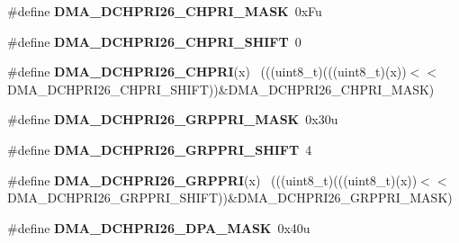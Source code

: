 \begin{DoxyCompactItemize}
\item 
\hypertarget{group___d_m_a___register___masks_gaf82eafce155eb9905efba3706f4b63af}{}\#define {\bfseries D\+M\+A\+\_\+\+D\+C\+H\+P\+R\+I26\+\_\+\+C\+H\+P\+R\+I\+\_\+\+M\+A\+S\+K}~0x\+Fu\label{group___d_m_a___register___masks_gaf82eafce155eb9905efba3706f4b63af}

\item 
\hypertarget{group___d_m_a___register___masks_gae85401152e683d9fbbaecacd40b2d75f}{}\#define {\bfseries D\+M\+A\+\_\+\+D\+C\+H\+P\+R\+I26\+\_\+\+C\+H\+P\+R\+I\+\_\+\+S\+H\+I\+F\+T}~0\label{group___d_m_a___register___masks_gae85401152e683d9fbbaecacd40b2d75f}

\item 
\hypertarget{group___d_m_a___register___masks_ga024f2d27fed4610a6777f20a3edbba1a}{}\#define {\bfseries D\+M\+A\+\_\+\+D\+C\+H\+P\+R\+I26\+\_\+\+C\+H\+P\+R\+I}(x)                                    ~(((uint8\+\_\+t)(((uint8\+\_\+t)(x))$<$$<$D\+M\+A\+\_\+\+D\+C\+H\+P\+R\+I26\+\_\+\+C\+H\+P\+R\+I\+\_\+\+S\+H\+I\+F\+T))\&D\+M\+A\+\_\+\+D\+C\+H\+P\+R\+I26\+\_\+\+C\+H\+P\+R\+I\+\_\+\+M\+A\+S\+K)\label{group___d_m_a___register___masks_ga024f2d27fed4610a6777f20a3edbba1a}

\item 
\hypertarget{group___d_m_a___register___masks_ga23d4fe848bd829d13e83d880599d02cf}{}\#define {\bfseries D\+M\+A\+\_\+\+D\+C\+H\+P\+R\+I26\+\_\+\+G\+R\+P\+P\+R\+I\+\_\+\+M\+A\+S\+K}~0x30u\label{group___d_m_a___register___masks_ga23d4fe848bd829d13e83d880599d02cf}

\item 
\hypertarget{group___d_m_a___register___masks_ga4750ffd4a20cef5b7b2801275bab6bed}{}\#define {\bfseries D\+M\+A\+\_\+\+D\+C\+H\+P\+R\+I26\+\_\+\+G\+R\+P\+P\+R\+I\+\_\+\+S\+H\+I\+F\+T}~4\label{group___d_m_a___register___masks_ga4750ffd4a20cef5b7b2801275bab6bed}

\item 
\hypertarget{group___d_m_a___register___masks_gad720b3fb70a1a3e77fa78020bc02e609}{}\#define {\bfseries D\+M\+A\+\_\+\+D\+C\+H\+P\+R\+I26\+\_\+\+G\+R\+P\+P\+R\+I}(x)                                  ~(((uint8\+\_\+t)(((uint8\+\_\+t)(x))$<$$<$D\+M\+A\+\_\+\+D\+C\+H\+P\+R\+I26\+\_\+\+G\+R\+P\+P\+R\+I\+\_\+\+S\+H\+I\+F\+T))\&D\+M\+A\+\_\+\+D\+C\+H\+P\+R\+I26\+\_\+\+G\+R\+P\+P\+R\+I\+\_\+\+M\+A\+S\+K)\label{group___d_m_a___register___masks_gad720b3fb70a1a3e77fa78020bc02e609}

\item 
\hypertarget{group___d_m_a___register___masks_ga815be759295d01eb25d8258dc38de4fd}{}\#define {\bfseries D\+M\+A\+\_\+\+D\+C\+H\+P\+R\+I26\+\_\+\+D\+P\+A\+\_\+\+M\+A\+S\+K}~0x40u\label{group___d_m_a___register___masks_ga815be759295d01eb25d8258dc38de4fd}


\end{DoxyCompactItemize}

